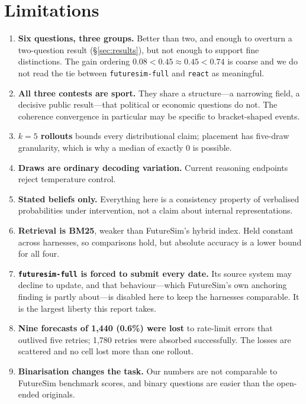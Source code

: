 \documentclass[10pt]{article}
\newcommand{\hr}[1]{\texttt{#1}}
\begin{document}
\section{Limitations}\label{sec:limits}
\begin{enumerate}
\item \textbf{Six questions, three groups.} Better than two, and enough to overturn a two-question
result (\S\ref{sec:results}), but not enough to support fine distinctions. The gain ordering
$0.08 < 0.45 \approx 0.45 < 0.74$ is coarse and we do not read the tie between
\hr{futuresim-full} and \hr{react} as meaningful.
\item \textbf{All three contests are sport.} They share a structure---a narrowing field, a decisive
public result---that political or economic questions do not. The coherence convergence in
particular may be specific to bracket-shaped events.
\item \textbf{$k{=}5$ rollouts} bounds every distributional claim; placement has five-draw
granularity, which is why a median of exactly 0 is possible.
\item \textbf{Draws are ordinary decoding variation.} Current reasoning endpoints reject
temperature control.
\item \textbf{Stated beliefs only.} Everything here is a consistency property of verbalised
probabilities under intervention, not a claim about internal representations.
\item \textbf{Retrieval is BM25}, weaker than FutureSim's hybrid index. Held constant across
harnesses, so comparisons hold, but absolute accuracy is a lower bound for all four.
\item \textbf{\hr{futuresim-full} is forced to submit every date.} Its source system may decline to
update, and that behaviour---which FutureSim's own anchoring finding is partly about---is disabled
here to keep the harnesses comparable. It is the largest liberty this report takes.
\item \textbf{Nine forecasts of 1{,}440 (0.6\%) were lost} to rate-limit errors that outlived five
retries; 1{,}780 retries were absorbed successfully. The losses are scattered and no cell lost more
than one rollout.
\item \textbf{Binarisation changes the task.} Our numbers are not comparable to FutureSim benchmark
scores, and binary questions are easier than the open-ended originals.
\end{enumerate}

\end{document}
